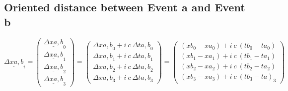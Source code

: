 \documentclass[]{article}
\begin{document}
\subsection{Oriented distance between Event a and Event b}
$
\underline{\Delta x{\scriptstyle a,b}}_i
=
\begin{pmatrix}
	\underline{{\scriptstyle \Delta}x{\scriptstyle a,b}}_0\\
	\underline{{\scriptstyle \Delta}x{\scriptstyle a,b}}_1\\
	\underline{{\scriptstyle \Delta}x{\scriptstyle a,b}}_2\\
	\underline{{\scriptstyle \Delta}x{\scriptstyle a,b}}_3
\end{pmatrix}
=
\begin{pmatrix}
	{\scriptstyle \Delta}x{\scriptstyle a,b}_0 + i\ c\ {\scriptstyle \Delta}t{\scriptstyle a,b}_0\\
	{\scriptstyle \Delta}x{\scriptstyle a,b}_1 + i\ c\ {\scriptstyle \Delta}t{\scriptstyle a,b}_1\\
	{\scriptstyle \Delta}x{\scriptstyle a,b}_2 + i\ c\ {\scriptstyle \Delta}t{\scriptstyle a,b}_2\\
	{\scriptstyle \Delta}x{\scriptstyle a,b}_3 + i\ c\ {\scriptstyle \Delta}t{\scriptstyle a,b}_3
\end{pmatrix}
=
\begin{pmatrix}
	(x{\scriptstyle b}_0-x{\scriptstyle a}_0) + i\ c\ (t{\scriptstyle b}_0-t{\scriptstyle a}_0)\\
	(x{\scriptstyle b}_1-x{\scriptstyle a}_1) + i\ c\ (t{\scriptstyle b}_1-t{\scriptstyle a}_1)\\
	(x{\scriptstyle b}_2-x{\scriptstyle a}_2) + i\ c\ (t{\scriptstyle b}_2-t{\scriptstyle a}_2)\\
	(x{\scriptstyle b}_3-x{\scriptstyle a}_3) + i\ c\ (t{\scriptstyle b}_3-t{\scriptstyle a})_3
\end{pmatrix}
$
\end{document}
